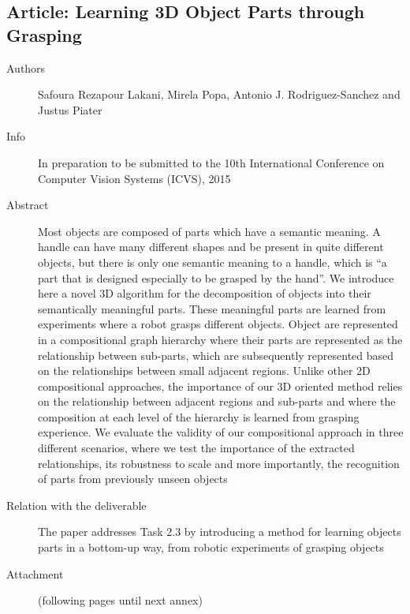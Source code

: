 \documentclass[a4paper,11pt,pdf]{pacmanreport}
\begin{document}
\subsection{Article: Learning 3D Object Parts through Grasping} \label{ann:icvs}
\begin{description}
	\item[Authors] Safoura Rezapour Lakani, Mirela Popa, Antonio J. Rodriguez-Sanchez and Justus Piater
	\item[Info] In preparation to be submitted to the 10th International Conference on Computer Vision Systems (ICVS), 2015
	\item[Abstract] Most objects are composed of parts which have a semantic 
meaning. A handle can have many different shapes and be present in quite 
different objects, but there is only one semantic meaning to a handle, which is 
``a part that is designed especially to be grasped by the hand''. We introduce 
here a novel 3D algorithm for the decomposition of objects into their 
semantically meaningful parts. These meaningful parts are learned from 
experiments where a robot grasps different objects. Object are represented in a 
compositional graph hierarchy where their parts are represented as the 
relationship between sub-parts, which are subsequently represented based on the 
relationships between small adjacent regions. Unlike other 2D compositional 
approaches, the importance of our 3D oriented method relies on the relationship 
between adjacent regions and sub-parts and where the composition at each level 
of the hierarchy is learned from grasping experience. We evaluate the validity 
of our compositional approach in three different scenarios, where we test the 
importance of the extracted relationships, its robustness to scale and more 
importantly, the recognition of parts from previously unseen objects
	\item[Relation with the deliverable] The paper addresses Task 2.3 by introducing a method for learning objects parts 
in a bottom-up way, from robotic experiments of grasping objects

    \item[Attachment] (following pages until next annex)
\end{description}

\end{document}
